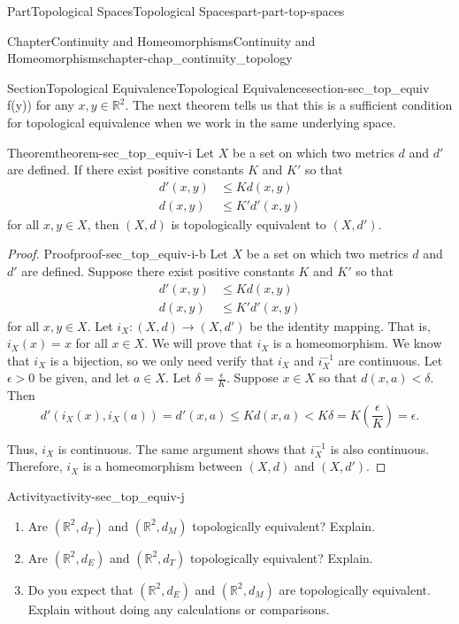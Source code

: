 \documentclass[oneside,10pt,]{book}
\numberwithin{equation}{chapter}
\newcommand{\R}{\mathbb{R}}
\newcommand{\lt}{<}
\newcommand{\gt}{>}
\newcommand{\amp}{&}
\begin{document}
\begin{partptx}{Part}{Topological Spaces}{}{Topological Spaces}{}{}{part-part-top-spaces}
\begin{chapterptx}{Chapter}{Continuity and Homeomorphisms}{}{Continuity and Homeomorphisms}{}{}{chapter-chap_continuity_topology}
\begin{sectionptx}{Section}{Topological Equivalence}{}{Topological Equivalence}{}{}{section-sec_top_equiv}
f(y))\) for any \(x, y \in \R^2\). The next theorem tells us that this is a sufficient condition for topological equivalence when we work in the same underlying space.%
\begin{theorem}{Theorem}{}{}{theorem-sec_top_equiv-i}%
Let \(X\) be a set on which two metrics \(d\) and \(d'\) are defined. If there exist positive constants \(K\) and \(K'\) so that%
\begin{align*}
d'(x,y) \amp \leq K d(x,y)\\
d(x,y) \amp \leq K' d'(x,y)
\end{align*}
for all \(x,y \in X\), then \((X,d)\) is topologically equivalent to \((X,d')\).%
\end{theorem}
\begin{proof}{Proof}{}{proof-sec_top_equiv-i-b}
Let \(X\) be a set on which two metrics \(d\) and \(d'\) are defined. Suppose there exist positive constants \(K\) and \(K'\) so that%
\begin{align*}
d'(x,y) \amp \leq K d(x,y)\\
d(x,y) \amp \leq K' d'(x,y)
\end{align*}
for all \(x,y \in X\). Let \(i_X : (X,d) \to (X,d')\) be the identity mapping. That is, \(i_X(x)=x\) for all \(x \in X\). We will prove that \(i_X\) is a homeomorphism. We know that \(i_X\) is a bijection, so we only need verify that \(i_X\) and \(i_X^{-1}\) are continuous. Let \(\epsilon \gt 0\) be given, and let \(a \in X\). Let \(\delta = \frac{\epsilon}{K}\). Suppose \(x \in X\) so that \(d(x,a) \lt  \delta\). Then%
\begin{equation*}
d'(i_X(x), i_X(a)) = d'(x,a) \leq Kd(x,a) \lt  K\delta = K\left(\frac{\epsilon}{K}\right) = \epsilon\text{.}
\end{equation*}
%
\par
Thus, \(i_X\) is continuous. The same argument shows that \(i_X^{-1}\) is also continuous. Therefore, \(i_X\) is a homeomorphism between \((X,d)\) and \((X,d')\).%
\end{proof}
\begin{activity}{Activity}{}{activity-sec_top_equiv-j}%
\begin{enumerate}[font=\bfseries,label=(\alph*),ref=\alph*]%
\item{}Are \((\R^2,d_T)\) and \((\R^2, d_M)\) topologically equivalent? Explain.%
\item{}Are \((\R^2,d_E)\) and \((\R^2, d_T)\) topologically equivalent? Explain.%
\item{}Do you expect that \((\R^2,d_E)\) and \((\R^2, d_M)\) are topologically equivalent. Explain without doing any calculations or comparisons.%

\end{enumerate}
\end{activity}
\end{sectionptx}
\end{chapterptx}
\end{partptx}
\end{document}
